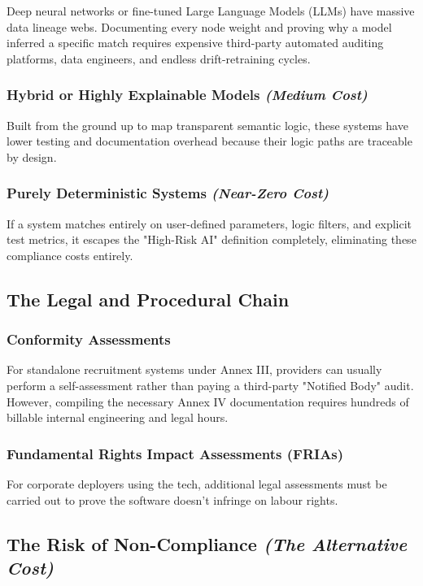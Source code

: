 \documentclass[a4paper, 12pt]{article}
\begin{document}
Deep neural networks or fine-tuned Large Language Models (LLMs) have massive data lineage webs. Documenting every node weight and proving why a model inferred a specific match requires expensive third-party automated auditing platforms, data engineers, and endless drift-retraining cycles.

\subsubsection{Hybrid or Highly Explainable Models \textit{(Medium Cost)}}

Built from the ground up to map transparent semantic logic, these systems have lower testing and documentation overhead because their logic paths are traceable by design.

\subsubsection{Purely Deterministic Systems \textit{(Near-Zero Cost)}}

If a system matches entirely on user-defined parameters, logic filters, and explicit test metrics, it escapes the "High-Risk AI" definition completely, eliminating these compliance costs entirely.

\subsection{The Legal and Procedural Chain}

\subsubsection{Conformity Assessments}

For standalone recruitment systems under Annex III, providers can usually perform a self-assessment rather than paying a third-party "Notified Body" audit. However, compiling the necessary Annex IV documentation requires hundreds of billable internal engineering and legal hours.

\subsubsection{Fundamental Rights Impact Assessments (FRIAs)}

For corporate deployers using the tech, additional legal assessments must be carried out to prove the software doesn't infringe on labour rights.

\subsection{The Risk of Non-Compliance \textit{(The Alternative Cost)}}
\end{document}
